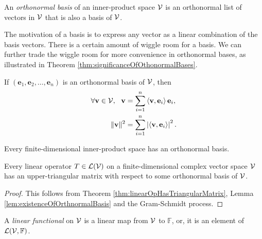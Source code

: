 \begin{defn}
  \label{def:orthonormalBasis}
  An \emph{orthonormal basis}
  of an inner-product space ${\cal V}$
  is an orthonormal list of vectors in ${\cal V}$
  that is also a basis of ${\cal V}$.
\end{defn}

\begin{rem}
  The motivation of a basis
  is to express any vector as a linear combination
  of the basis vectors.
  There is a certain amount of wiggle room
  for a basis.
  We can further trade the wiggle room
  for more convenience
  in orthonormal bases,
  as illustrated in Theorem \ref{thm:significanceOfOthonormalBases}.
\end{rem}

\begin{thm}
  \label{thm:significanceOfOthonormalBases}
  If $(\mathbf{e}_1, \mathbf{e}_2, \ldots, \mathbf{e}_n)$
  is an orthonormal basis of ${\cal V}$,
  then 
  \begin{subequations}
    \label{eq:expressVectorsInOrthonormalBasis}
    \begin{align}
      \forall \mathbf{v}\in {\cal V},\ \ 
      \mathbf{v}
      &= \sum_{i=1}^n \innerProd{\mathbf{v}, \mathbf{e}_i} \mathbf{e}_i,
      \\
      \|\mathbf{v}\|^2
      &= \sum_{i=1}^n \left|\innerProd{\mathbf{v}, \mathbf{e}_i}\right|^2.
    \end{align}
  \end{subequations}
\end{thm}

\begin{lem}
  \label{lem:existenceOfOrthnormalBasis}
  Every finite-dimensional inner-product space has an orthonormal basis.
\end{lem}

\begin{thm}[Schur]
  \label{thm:Schur}
  Every linear operator $T\in {\cal L}({\cal V})$
  on a finite-dimensional complex vector space ${\cal V}$ 
  has an upper-triangular matrix
  with respect to some orthonormal basis of ${\cal V}$.
\end{thm}
\begin{proof}
  This follows from Theorem \ref{thm:linearOpHasTriangularMatrix}, 
  Lemma \ref{lem:existenceOfOrthnormalBasis}
  and the Gram-Schmidt process.
\end{proof}

\begin{defn}
  \label{def:linearFunctional}
  A \emph{linear functional} on ${\cal V}$ is a linear map from ${\cal V}$ to
  $\mathbb{F}$,
  or, it is an element of ${\cal L}({\cal V},\mathbb{F})$.
\end{defn}

